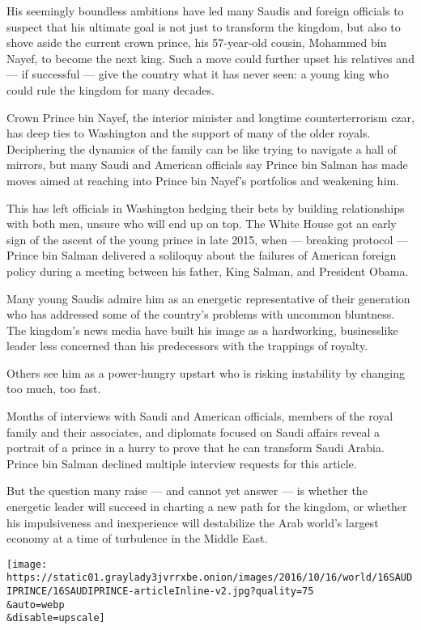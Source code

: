His seemingly boundless ambitions have led many Saudis and foreign
officials to suspect that his ultimate goal is not just to transform the
kingdom, but also to shove aside the current crown prince, his
57-year-old cousin, Mohammed bin Nayef, to become the next king. Such a
move could further upset his relatives and --- if successful --- give
the country what it has never seen: a young king who could rule the
kingdom for many decades.

Crown Prince bin Nayef, the interior minister and longtime
counterterrorism czar, has deep ties to Washington and the support of
many of the older royals. Deciphering the dynamics of the family can be
like trying to navigate a hall of mirrors, but many Saudi and American
officials say Prince bin Salman has made moves aimed at reaching into
Prince bin Nayef's portfolios and weakening him.

This has left officials in Washington hedging their bets by building
relationships with both men, unsure who will end up on top. The White
House got an early sign of the ascent of the young prince in late 2015,
when --- breaking protocol --- Prince bin Salman delivered a soliloquy
about the failures of American foreign policy during a meeting between
his father, King Salman, and President Obama.

Many young Saudis admire him as an energetic representative of their
generation who has addressed some of the country's problems with
uncommon bluntness. The kingdom's news media have built his image as a
hardworking, businesslike leader less concerned than his predecessors
with the trappings of royalty.

Others see him as a power-hungry upstart who is risking instability by
changing too much, too fast.

Months of interviews with Saudi and American officials, members of the
royal family and their associates, and diplomats focused on Saudi
affairs reveal a portrait of a prince in a hurry to prove that he can
transform Saudi Arabia. Prince bin Salman declined multiple interview
requests for this article.

But the question many raise --- and cannot yet answer --- is whether the
energetic leader will succeed in charting a new path for the kingdom, or
whether his impulsiveness and inexperience will destabilize the Arab
world's largest economy at a time of turbulence in the Middle East.

\texttt{[image: https://static01.graylady3jvrrxbe.onion/images/2016/10/16/world/16SAUDIPRINCE/16SAUDIPRINCE-articleInline-v2.jpg?quality=75\\\&auto=webp\\\&disable=upscale]}

